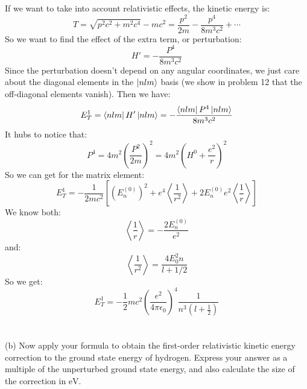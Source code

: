 \documentclass[12pt]{article}
\begin{document}
\subsubsection{}
If we want to take into account relativistic effects, the kinetic energy is:
\begin{equation}
  T = \sqrt{p^2c^2 + m^2c^4} - mc^2 = \frac{p^2}{2m} - \frac{p^4}{8m^3c^2} + \cdots
\end{equation}
So we want to find the effect of the extra term, or perturbation:
\begin{equation}
  H' = -\frac{P^4}{8m^3c^2}
\end{equation}
Since the perturbation doesn't depend on any angular coordinates, we just care about the diagonal elements in the $\ket{nlm}$ basis (we show in problem 12 that the off-diagonal elements vanish). Then we have:
\begin{equation}
  E^{1}_T = \bra{nlm}H'\ket{nlm} = -\frac{\bra{nlm}P^4\ket{nlm}}{8m^3c^2}
\end{equation}
It hubs to notice that:
\begin{equation}
  P^4 = 4m^2\left(\frac{P^2}{2m} \right)^2 = 4m^2\left(H^0 + \frac{e^2}{r} \right)^2
\end{equation}
So we can get for the matrix element:
\begin{equation}
  E^{1}_T = -\frac{1}{2mc^{2}}  \left[ (E_{n}^{(0)})^{2}+e^4\left\langle\frac{1}{r^2}\right\rangle+2 E_{n}^{(0)}e^2\left\langle\frac{1}{r}\right\rangle\right]
\end{equation}
We know both:
\begin{equation}
  \left\langle\frac{1}{r}\right\rangle = -\frac{2E_{n}^{(0)}}{e^{2}}
\end{equation}
and:
\begin{equation}
  \left\langle\frac{1}{r^2}\right\rangle = \frac{4E_{0}^{2}n}{l + 1 / 2}
\end{equation}
So we get:
\begin{equation}
  E^{1}_T = -\frac{1}{2}m c^{2}\left(\frac{e^{2}}{4 \pi \epsilon_{0}}\right)^{4} \frac{1}{n^{3}\left(l+\frac{1}{2}\right)}
\end{equation}
\section{}
(b) Now apply your formula to obtain the first-order relativistic kinetic energy correction to the ground state energy of hydrogen. Express your answer as a multiple of the unperturbed ground state energy, and also calculate the size of the correction in $\mathrm{eV}$.
\end{document}
